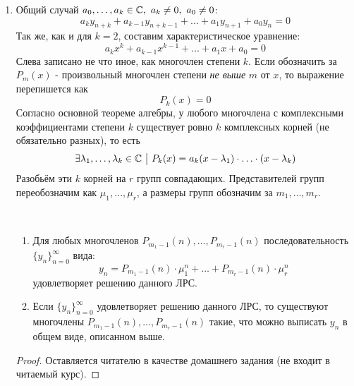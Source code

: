 \begin{enumerate}
	\item Общий случай $a_0, \ldots, a_k \in \mathbb{C},\ a_k \neq 0,\ a_0 \neq 0$:
	\[
		a_k y_{n + k} + a_{k - 1} y_{n + k - 1} + \ldots + a_1 y_{n + 1} + a_0 y_n = 0
	\]
	Так же, как и для $k = 2$, составим характеристическое уравнение:
	\[
		a_k x^k + a_{k - 1} x^{k - 1} + \ldots + a_1 x + a_0 = 0
	\]
	Слева записано не что иное, как многочлен степени $k$. Если обозначить за $P_m(x)$ - произвольный многочлен степени \textit{не выше} $m$ от $x$, то выражение перепишется как
	\[
		P_k(x) = 0
	\]
	Согласно основной теореме алгебры, у любого многочлена с комплексными коэффициентами степени $k$ существует ровно $k$ комплексных корней (не обязательно разных), то есть
	\[
		\exists \lambda_1, \ldots, \lambda_k \in \mathbb{C} \ \big|\  P_k(x) = a_k(x - \lambda_1) \cdot \ldots \cdot (x - \lambda_k)
	\]
	Разобьём эти $k$ корней на $r$ групп совпадающих. Представителей групп переобозначим как $\mu_1, \ldots, \mu_r$, а размеры групп обозначим за $m_1, \ldots, m_r$.
	\begin{theorem}~
		\begin{enumerate}
			\item Для любых многочленов $P_{m_1 - 1}(n), \ldots, P_{m_r - 1}(n)$ последовательность $\{y_n\}_{n = 0}^\infty$ вида:
			\[
				y_n = P_{m_1 - 1}(n) \cdot \mu^n_1 + \ldots + P_{m_r - 1}(n) \cdot \mu^n_r
			\]
			удовлетворяет решению данного ЛРС.
			
			\item Если $\{y_n\}_{n = 0}^\infty$ удовлетворяет решению данного ЛРС, то существуют многочлены $P_{m_1 - 1}(n), \ldots, P_{m_r - 1}(n)$ такие, что можно выписать $y_n$ в общем виде, описанном выше.
		\end{enumerate}
	\end{theorem}

	\begin{proof}
		Оставляется читателю в качестве домашнего задания (не входит в читаемый курс).
	\end{proof}
\end{enumerate}